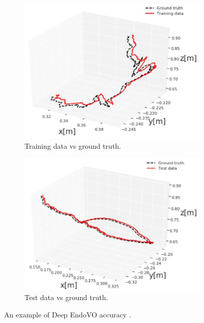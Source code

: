 \documentclass[english, a4paper]{article}
\begin{document}
\begin{figure}[h] %
  \centering
  \begin{subfigure}[b]{0.4\linewidth}%
    \centering
    \includegraphics[width=\linewidth]{endovo_training_data}%
    \caption{Training data vs ground truth. }%
    \label{fig:endovo_training_data}%
  \end{subfigure}%
  \quad
  \begin{subfigure}[b]{0.4\linewidth}%
    \centering
    \includegraphics[width=\linewidth]{endovo_test_data}%
    \caption{Test data vs ground truth. }%
    \label{fig:endovo_test_data}%
  \end{subfigure}%
  \caption{An example of Deep EndoVO accuracy \cite{DeepEndoVO18}. }%
  \label{fig:deep_endovo_example}%
\end{figure}%
\end{document}
